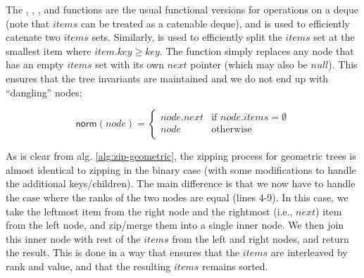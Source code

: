 \documentclass{article}
\begin{document}
\begin{algorithm}[ht]
    \caption{Zip function for geometric trees}\label{alg:zip-geometric}
    \DontPrintSemicolon

\end{algorithm}

The \shift, \unshift, \pop, and \push functions are the usual functional versions for operations on a deque (note that $items$ can be treated as a catenable deque), and \join is used to efficiently catenate two $items$ sets. Similarly, \split is used to efficiently split the $items$ set at the smallest item where $item.key \ge key$. The \norm function simply replaces any node that has an empty $items$ set with its own $next$ pointer (which may also be $null$). This ensures that the tree invariants are maintained and we do not end up with ``dangling'' nodes:

$$
    \textsf{norm}(node) =
    \begin{cases}
        node.next & \text{if } node.items = \emptyset \\
        node      & \text{otherwise}                  \\
    \end{cases}
$$

As is clear from alg. \ref{alg:zip-geometric}, the zipping process for geometric trees is almost identical to zipping in the binary case (with some modifications to handle the additional keys/children). The main difference is that we now have to handle the case where the ranks of the two nodes are equal (lines 4-9). In this case, we take the leftmost item from the right node and the rightmost (i.e., $next$) item from the left node, and zip/merge them into a single inner node. We then join this inner node with rest of the $items$ from the left and right nodes, and return the result. This is done in a way that ensures that the $items$ are interleaved by rank and value, and that the resulting $items$ remains sorted.
\end{document}
